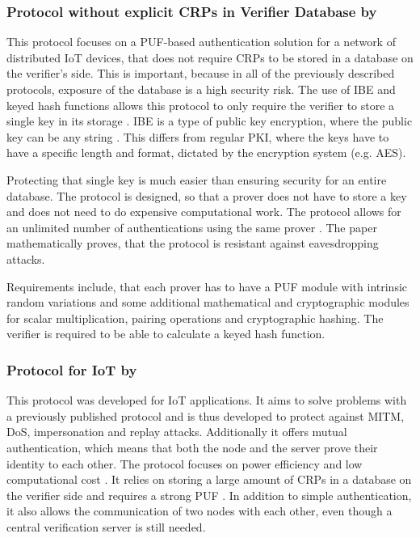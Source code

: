 \subsubsection{Protocol without explicit CRPs in Verifier Database by \citeauthor*{Chatterjee2019}}
\label{sec:review_protocol_3}

This protocol focuses on a PUF-based authentication solution for a network of distributed IoT
devices, that does not require CRPs to be stored in a database
on the verifier's side. This is important, because in all of the previously
described protocols, exposure of the database is a high security risk.
The use of \ac{IBE} and keyed hash functions allows this protocol to
only require the verifier to store a single key in its storage \cite[][p. 1f]{Chatterjee2019}.
\ac{IBE} is a type of public key encryption, where the public key can be any string \cite[][p. 8]{Chatterjee2011}.
This differs from regular \ac{PKI}, where the keys have to have a specific length and
format, dictated by the encryption system (e.g. AES). \cite[][p. 3]{Chatterjee2011}

Protecting that single key is much easier than ensuring security for an entire database.
The protocol is designed, so that a prover does not have to store a key and does not need
to do expensive computational work. The protocol allows for an unlimited number of
authentications using the same prover \cite[][p. 2f]{Chatterjee2019}.
The paper mathematically proves, that the protocol is resistant against eavesdropping attacks. \cite[][p. 8]{Chatterjee2019}

Requirements include, that each prover has to have a PUF module with intrinsic random variations
and some additional mathematical and cryptographic modules for scalar multiplication,
pairing operations and cryptographic hashing.
The verifier is required to be able to calculate a keyed hash function.  \cite[][p. 1f]{Chatterjee2019}




\subsubsection{Protocol for IoT by \citeauthor*{Braeken2018}}
\label{sec:review_protocol_4}

This protocol was developed for IoT applications. It aims to solve problems with a previously
published protocol and is thus developed to protect against \ac{MITM}, \ac{DoS},
impersonation and replay attacks. Additionally it offers mutual authentication, which means
that both the node and the server prove their identity to each other.
The protocol focuses on power efficiency and low computational cost \cite[][p. 1f, 8]{Braeken2018}.
It relies on storing a large amount of CRPs in a database on the verifier side and
requires a strong PUF \cite[][p. 4]{Braeken2018}.
In addition to simple authentication, it also allows the communication of two nodes
with each other, even though a central verification server is still needed. \cite[][p. 3f]{Braeken2018}

